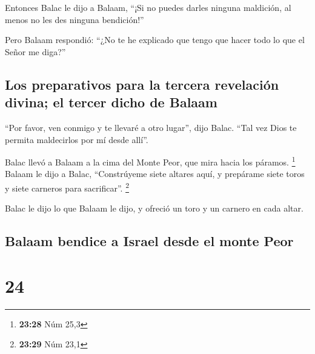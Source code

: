  Entonces Balac le dijo a Balaam, ``¡Si no puedes darles
ninguna maldición, al menos no les des ninguna bendición!''

 Pero Balaam respondió: ``¿No te he explicado que tengo
que hacer todo lo que el Señor me diga?''

\hypertarget{los-preparativos-para-la-tercera-revelaciuxf3n-divina-el-tercer-dicho-de-balaam}{%
\subsection{Los preparativos para la tercera revelación divina; el
tercer dicho de
Balaam}\label{los-preparativos-para-la-tercera-revelaciuxf3n-divina-el-tercer-dicho-de-balaam}}

 ``Por favor, ven conmigo y te llevaré a otro lugar'',
dijo Balac. ``Tal vez Dios te permita maldecirlos por mí desde allí''.

 Balac llevó a Balaam a la cima del Monte Peor, que mira
hacia los páramos. \footnote{\textbf{23:28} Núm 25,3} 
Balaam le dijo a Balac, ``Constrúyeme siete altares aquí, y prepárame
siete toros y siete carneros para sacrificar''. \footnote{\textbf{23:29}
  Núm 23,1}

 Balac le dijo lo que Balaam le dijo, y ofreció un toro y
un carnero en cada altar.

\hypertarget{balaam-bendice-a-israel-desde-el-monte-peor}{%
\subsection{Balaam bendice a Israel desde el monte
Peor}\label{balaam-bendice-a-israel-desde-el-monte-peor}}

\hypertarget{section-23}{%
\section{24}\label{section-23}}

